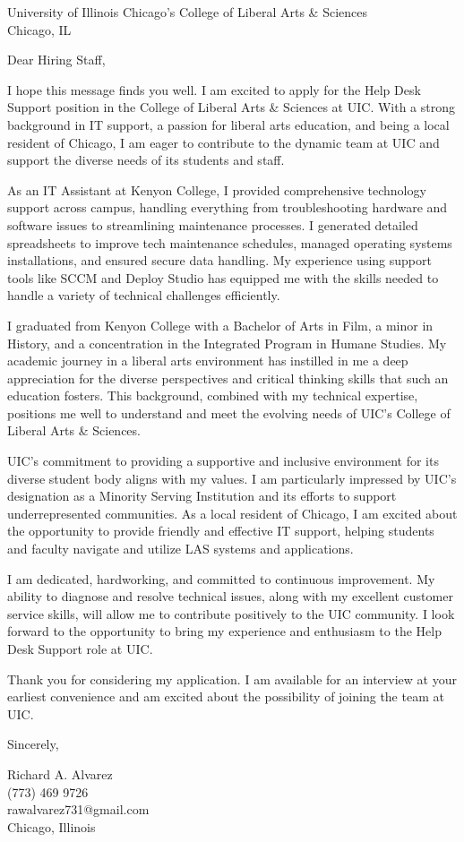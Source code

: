 \documentclass[a4paper,10pt]{letter}
\begin{document}
\begin{letter}{University of Illinois Chicago's College of Liberal Arts \& Sciences \\
Chicago, IL}

\opening{Dear Hiring Staff,}
I hope this message finds you well. I am excited to apply for the Help Desk Support position in the College of Liberal Arts \& Sciences at UIC. With a strong background in IT support, a passion for liberal arts education, and being a local resident of Chicago, I am eager to contribute to the dynamic team at UIC and support the diverse needs of its students and staff.

As an IT Assistant at Kenyon College, I provided comprehensive technology support across campus, handling everything from troubleshooting hardware and software issues to streamlining maintenance processes. I generated detailed spreadsheets to improve tech maintenance schedules, managed operating systems installations, and ensured secure data handling. My experience using support tools like SCCM and Deploy Studio has equipped me with the skills needed to handle a variety of technical challenges efficiently.

I graduated from Kenyon College with a Bachelor of Arts in Film, a minor in History, and a concentration in the Integrated Program in Humane Studies. My academic journey in a liberal arts environment has instilled in me a deep appreciation for the diverse perspectives and critical thinking skills that such an education fosters. This background, combined with my technical expertise, positions me well to understand and meet the evolving needs of UIC’s College of Liberal Arts \& Sciences.

UIC’s commitment to providing a supportive and inclusive environment for its diverse student body aligns with my values. I am particularly impressed by UIC’s designation as a Minority Serving Institution and its efforts to support underrepresented communities. As a local resident of Chicago, I am excited about the opportunity to provide friendly and effective IT support, helping students and faculty navigate and utilize LAS systems and applications.

I am dedicated, hardworking, and committed to continuous improvement. My ability to diagnose and resolve technical issues, along with my excellent customer service skills, will allow me to contribute positively to the UIC community. I look forward to the opportunity to bring my experience and enthusiasm to the Help Desk Support role at UIC.

Thank you for considering my application. I am available for an interview at your earliest convenience and am excited about the possibility of joining the team at UIC.

\closing{Sincerely,}


Richard A. Alvarez \\
(773) 469 9726 \\
rawalvarez731@gmail.com \\
Chicago, Illinois

\end{letter}
\end{document}
